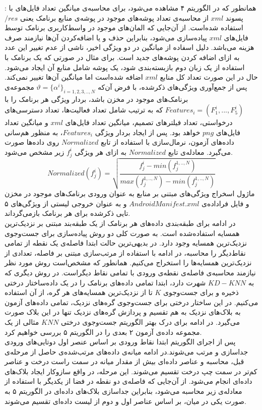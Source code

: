 :  همانطور که در الگوریتم ۴ مشاهده می‌شود، برای محاسبه‌ی میانگین تعداد فایل‌های با پسوند $xml$ از محاسبه‌ی تعداد پوشه‌های موجود در پوشه‌ی منابع برنامک یعنی $/res$ استفاده شده‌است. از آن‌جایی که المان‌های موجود در واسط‌کاربری برنامک توسط فایل‌های $xml$ پیاده‌سازی می‌شود، بنابراین حذف و یا اضافه‌کردن آن‌ها نیازمند صرف هزینه می‌باشد. دلیل اسفاده از میانگین در دو ویژگی اخیر، ناشی از عدم تغییر این عدد به ازای اضافه کردن پوشه‌های جدید است. برای مثال در صورتی که یک برنامک با استفاده از یک زبان دوم بازبسته‌بندی شود، یک پوشه‌ شامل منابع آن ایجاد می‌شود. حال در این صورت تعداد کل منابع $xml$ اضافه شده‌است اما میانگین آن‌ها تغییر نمی‌کند.
پس از جمع‌آوری ویژگی‌های ذکر‌شده، با فرض آن‌که $ \vartheta =\{\alpha ^{i}\}_{i=1,2,3,..,N}$
مجموعه‌ی برنامک‌های موجود در مخزن‌ باشد، بردار ویژگی هر برنامک را با 
$Features_{i} =(F^{i}_{1},...,F^{i}_{5})$
که به ترتیب شامل  تعداد فعالیت‌ها، تعداد دسترسی‌های درخواستی، تعداد فیلتر‌های تصمیم، میانگین تعداد فایل‌های $xml$ و میانگین تعداد فایل‌های $png$ خواهد بود. پس از ایجاد بردار ویژگی $Features_{i}$، به منظور هم‌سانی‌ داده‌های آزمون، نرمال‌سازی با استفاده از تابع $Normalized$ روی داده‌ها صورت می‌گیرد. معادله‌ی تابع $Normalized$ به ازای هر ویژگی $f^{i}_{j}$ زیر مشخص‌ می‌شود.\\
\begin{equation}
Normalized(f^{i}_{j})=\sqrt{\frac{f^{i}_{j}-min(f^{1,..,N}_{j})}{max(f^{1,..,N}_{j})-min(f^{1,..,N}_{j})}}
\end{equation}
ماژول اسخراج ویژگی‌های مبتنی بر منابع به عنوان ورودی برنامک‌های موجود در مخزن و فایل فراداده‌ی $AndroidManifest.xml$ و به عنوان خروجی لیستی از ویژگی‌های ۵ تایی ذکرشده برای هر برنامک بازمی‌گرداند.
\\
در ادامه برای طبقه‌بندی داده‌های هر برنامک از یک طبقه‌بند مبتنی بر نزدیک‌ترین همسایه‌ استفاده‌شده است. به صورت کلی دو روش پیاده‌سازی برای جست‌و‌جوی نزدیک‌ترین همسایه وجود دارد. در بدیهی‌ترین حالت ابتدا فاصله‌ی یک نقطه از تمامی نقاط‌دیگر را محاسبه، در ادامه با استفاده از مرتب‌سازی مبتنی بر فاصله، تعدادی از نزدیک‌ترین همسایه‌ها را استخراج می‌کنیم. همانطور که مشخص‌است روش مورد نظر نیازمند محاسبه‌ی فاصله‌ی نقطه‌ی ورودی با تمامی نقاط دیگر‌است. در روش دیگری که به $KD-KNN$ شهرت دارد، ابتدا تمامی داده‌های برنامک را در یک داده‌ساختار درختی ذخیره و برای جست‌و‌جوی $K$ تا از نزدیک‌ترین همسایه‌های هر گره، از آن استفاده می‌کنیم. در این ساختار درختی برای جست‌و‌جوی گره‌های نزدیک، تمامی داده‌های آزمون به بلاک‌های نزدیک به هم تقسیم و پردازش گره‌های نزدیک‌ تنها در این بلاک صورت می‌گیرد. در ادامه برای درک بهتر الگوریتم جست‌و‌جوی درختی $KNN$ مثالی از یک مجموعه‌ داده‌ی آزمون ۲ بعدی را در الگوریتم ۵ بررسی خواهیم کرد. \\
پس از اجرای الگوریتم ابتدا نقاط ورودی بر اساس عنصر اول دوتایی‌های ورودی جداسازی و مرتب‌ می‌شوند.در ادامه میانه‌ی داده‌‌های مرتب‌شده‌ی حاصل از مرحله‌ی قبل، محاسبه و عناصر داده‌ای بیش از مقدار میانه در سمت راست درخت و عناصر کم‌تر در سمت چپ درخت تقسیم می‌شوند. این مرحله‌، در واقع سازو‌کار ایجاد بلاک‌های داده‌ای انجام می‌شود. از آن‌جایی که فاصله‌ی دو نقطه در فضا از یکدیگر با استفاده از معادله‌ی زیر محاسبه می‌شود، بنابراین جداسازی بلاک‌های داده‌ای در الگوریتم ۵ به صورت یکی در میان، بر اساس عناصر اول و دوم از لیست داده‌ای تقسیم می‌شوند.

